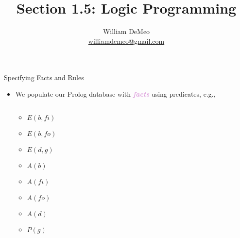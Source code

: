 \documentclass[xcolor=dvipsnames,9pt,handout,show notes]{beamer}
\title[Sec. 1.5: Logic Programming]{Section 1.5: Logic Programming}
\author[William DeMeo]{William DeMeo\\
{\small \url{williamdemeo@gmail.com}}}
\institute[\url{williamdemeo@gmail}]{
  \vskip-1cm
  {\small {\color{darkred}  University of South Carolina}}
}
\theoremstyle{definition}
\theoremstyle{remark}
\numberwithin{theorem}{section}
\numberwithin{claim}{section}
\numberwithin{equation}{section}
\numberwithin{conjecture}{section}
\newcommand{\defn}[1]{\textcolor{Plum}{\textit{\textbf{#1}}}}
\begin{document}
\thicklines
\setcounter{section}{+1}
\setcounter{secnumdepth}{2}


\frame[label=titlepage]{

  \titlepage
}

\begin{frame}[shrink=5]{Specifying Facts and Rules}
  \begin{itemize}
  \item We populate our Prolog database with \defn{facts} using predicates, e.g.,
  \begin{columns}
    \begin{column}{0.3\textwidth}
      \begin{center}
    \begin{itemize}
    \item $E(b, fi)$
    \item $E(b, fo)$
    \item $E(d, g)$
    \item $A(b)$
    \item $A( fi)$
    \item $A( fo)$
    \item $A(d)$
    \item $P(g)$
    \end{itemize}
      \end{center}
    \end{column}
  \begin{column}{0.4\textwidth}
  \end{column}
\end{columns}


\end{itemize}
\end{frame}
\end{document}
